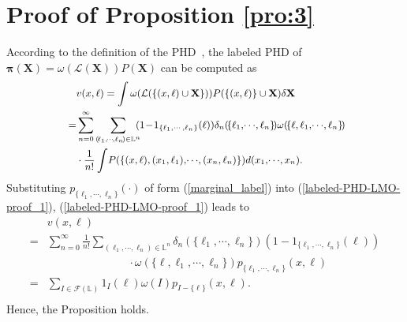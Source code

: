 \documentclass[journal]{IEEEtran}
\newcommand{\bX}{{\mathbf X}}
\newcommand{\bpi}{{\boldsymbol\pi}}
\begin{document}
{\section{Proof of Proposition \ref{pro:3}}
According to the definition of the PHD~\cite{refr:Mahler_book}, the labeled PHD of $\bpi(\bX)=\omega(\mathcal{L}(\bX))P(\bX)$ can be computed as
\begin{equation}\label{labeled-PHD-LMO-proof_1}
{\small
\begin{split}
& v(x,\ell)=\int\omega(\mathcal{L}(\{(x,\ell)\cup\mathbf{X}\}))P(\{(x,\ell)\}\cup\mathbf{X})\delta\bX\\
=&\sum_{n=0}^\infty\sum_{(\!\ell_1,\!\cdots\!,\ell_n\!)\in\mathbb{L}^n}\!\!\!(1\!-\!1_{\{\ell_1,\cdots,\ell_n\}}(\ell))\delta_n(\!\{\ell_1,\!\cdots\!,\ell_n\}\!)\omega(\!\{\ell,\ell_1,\!\cdots\!,\ell_n\}\!)\!\!\\&\cdot  \frac{1}{n!} \int\! P(\{(x,\ell),(x_1,\ell_1),\!\cdots\!,(x_n,\ell_n)\})d(x_1,\!\cdots\!,x_n).\\
  \end{split}}
  \end{equation}
 Substituting $p_{\{\ell_1,\cdots,\ell_n\}}(\cdot)$ of form (\ref{marginal_label})  into (\ref{labeled-PHD-LMO-proof_1}), (\ref{labeled-PHD-LMO-proof_1}) leads to 
\begin{equation}\label{labeled-PHD-LMO-proof_2}
\begin{split}
\!\!&v(x,\ell)
   \\
   \!\!=&\sum_{n=0}^\infty \frac{1}{n!}\!\sum_{(\ell_1,\cdots,\ell_n)\in\mathbb{L}^n}\delta_n(\{\ell_1,\cdots,\ell_n\})(1-1_{\{\ell_1,\cdots,\ell_n\}}(\ell)) \\
   \!\!&\,\,\,\,\,\,\,\,\,\,\,\,\,\,\,\,\,\,\,\,\,\,\,\,\,\,\,\,\,\,\,\,\,\,\,\,\,\,\,\,\,\,\,\,\cdot\omega(\{\ell,\ell_1,\cdots,\ell_n\}) p_{\{\ell_1,\cdots,\ell_n\}}(x,\ell)\\
\!\!=& {\sum}_{I\in\mathcal{F}(\mathbb{L})}1_{I}(\ell)\omega(I)p_{I-\{\ell\}}(x,\ell).\\
\end{split}
\end{equation}
Hence, the Proposition holds.
}
\end{document}
